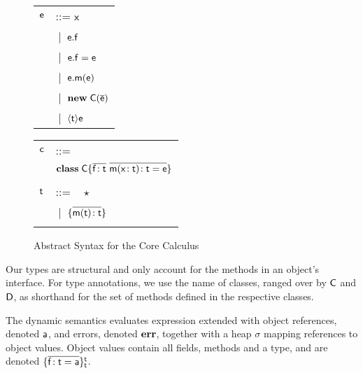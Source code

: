 \documentclass[preprint]{sigplanconf}
\newcommand{\m}{\M{\xt{m}}}
\newcommand{\e}{\M{\xt{e}}}
\newcommand{\f}{\M{\xt{f}}}
\newcommand{\x}{\M{\xt{x}}}
\renewcommand{\t}{\M{\xt{t}}}
\renewcommand{\c}{\M{\xt{c}}}
\newcommand{\C}{\M{\xt{C}}}
\newcommand{\D}{\M{\xt{D}}}
\newcommand{\err}{\M{\bt{err}}}
\newcommand{\s}{\M{\sigma}}
\renewcommand{\a}{\M{\xt a}}
\newcommand{\new}{\M{\bt{new}}}
\newcommand{\Get}[2]{\M{#1.#2}}
\newcommand{\Set}[3]{\M{#1.#2=#3}}
\newcommand{\Call}[3]{\M{#1.#2(#3)}}
\newcommand{\New}[2]{\M{\new\;#1({#2})}}
\newcommand{\Cast}[2]{\M{\langle{#1}\rangle{#2}}}
\newcommand{\any}{\M{\star}}
\newcommand{\Type}[1]{\M{\{ #1 \}}}
\newcommand{\HT}[2]{\M{{#1}\!:{#2}}}
\newcommand{\Mdef}[5]{\M{ \HT { #1( \HT{#2}{#3})}{#4}={#5}}}
\newcommand{\Ftype}[2]{\M{ \HT{#1}{#2} }}
\newcommand{\Fdef}[3]{\M{ \HT{#1}{#2}={#3} }}
\newcommand{\Mtype}[3]{\M{ \HT { #1( #2 )}{#3}}}
\newcommand{\Class}[3]{\M{\bt{class}\;#1\{ #2 ~ #3 \}}}
\newcommand{\Obj}[3]{ \M{\{ #1 \}^{#2}_{#3}}}
\newcommand{\Alt}[1]{ &\B #1 \\}
\newcommand{\B}{\M{~|~}}
\newcommand{\M}[1]{\ensuremath{#1}\xspace}
\newcommand{\xt}[1]{\sf{#1}}
\newcommand{\bt}[1]{\xt{\bf #1}}
\renewcommand{\b}[1]{\M{\overline{#1}}}
\begin{document}
\begin{figure}[!h]
\begin{minipage}{3cm}\begin{tabular}{ll}
\e &::=  \x \\
   \Alt{ \Get\e\f }
   \Alt{ \Set\e\f\e }
   \Alt{ \Call\e\m\e }
   \Alt{ \New\C{\b\e} }
   \Alt{ \Cast\t\e }
\end{tabular}\end{minipage}\begin{minipage}{3cm}\begin{tabular}{ll}
\c &::= \\
  &\Class \C {\b{\Ftype\f\t}} {\b{\Mdef\m\x\t\t\e}} \\
\\
\t &::= ~ \any \\
   \Alt{ \Type{  \b{ \Mtype\m\t\t } } }
\\
\end{tabular}\end{minipage}
\caption{Abstract Syntax for the Core Calculus}\label{syn}
\end{figure}

Our types are structural and only account for the methods in an object's
interface. For type annotations, we use the name of classes, ranged over by
\C and \D, as shorthand for the set of methods defined in the respective
classes.



The dynamic semantics evaluates expression extended with object references,
denoted \a, and errors, denoted \err, together with a heap \s mapping
references to object values. Object values contain all fields, methods and a
type, and are denoted \Obj{\b{\Fdef\f\t\a}}\t{\t}. 



\newcommand{\CondRule}[3]{ #3 & {if} #2 &\small #1\\}
\newcommand{\NoCondRule}[2]{ #2 &           &\small #1\\}
\newcommand{\Reduce}[4]{\M{ #1~#2 \rightarrow #3~#4}}
\newcommand{\ReduceA}[4]{\M{ #1 ~ #2 } &  \M { \rightarrow #3 ~ #4}}
\end{document}
